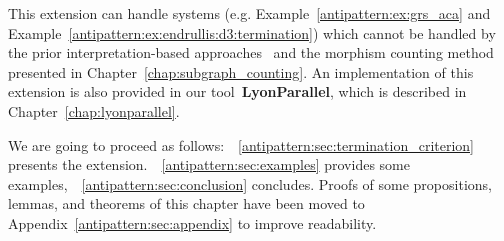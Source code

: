 This extension can handle systems (e.g. Example~\ref{antipattern:ex:grs_aca} and Example~\ref{antipattern:ex:endrullis:d3:termination}) which cannot be handled by the
prior interpretation-based approaches~\cite{zantema2014termination,bruggink2014termination,bruggink2015proving,endrullis2024generalized_arxiv_v2,overbeek2024termination_lmcs} and the morphism counting method presented in Chapter~\ref{chap:subgraph_counting}.
An implementation of this extension is also provided in our tool~\textbf{LyonParallel}, which is described in Chapter~\ref{chap:lyonparallel}.

We are going to proceed as follows:~\textsection~\ref{antipattern:sec:termination_criterion} presents the extension.~\textsection~\ref{antipattern:sec:examples} provides some examples,~\textsection~\ref{antipattern:sec:conclusion} concludes. Proofs of some propositions, lemmas, and theorems of this chapter have been moved to Appendix~\ref{antipattern:sec:appendix} to improve readability.